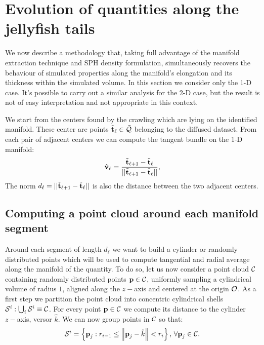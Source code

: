 \section{Evolution of quantities along the jellyfish tails}


We now describe a methodology that, taking full advantage of the manifold extraction technique and SPH density formulation, simultaneously recovers the behaviour of simulated properties along the manifold's elongation and its thickness within the simulated volume.
In this section we consider only the 1-D case.
It's possible to carry out a similar analysis for the 2-D case, but
the result is not of easy interpretation and not appropriate in this context.

We start from the centers found by the crawling which are lying on the identified manifold. These center are points $\tilde{\boldsymbol{\mathbf{t}}}_{\ell} \in \tilde{\mathcal{Q}}$ belonging to the diffused dataset.
From each pair of adjacent centers we can compute the tangent bundle on the 1-D manifold:
\begin{equation}
  \hat{\boldsymbol{\mathbf{v}}}_{\ell} =  \frac{\tilde{\boldsymbol{\mathbf{t}}}_{\ell + 1} - \tilde{\boldsymbol{\mathbf{t}}}_{\ell}}{|| \tilde{\boldsymbol{\mathbf{t}}}_{\ell + 1} - \tilde{\boldsymbol{\mathbf{t}}}_{\ell}||},
\end{equation}
The norm $d_{\ell} = || \tilde{\boldsymbol{\mathbf{t}}}_{\ell + 1} - \tilde{\boldsymbol{\mathbf{t}}}_{\ell}||$ is also the distance between the two adjacent centers.

\subsection{Computing a point cloud around each manifold segment}
Around each segment of length $d_{\ell}$ we want to build a cylinder or randomly distributed points which will be used to compute tangential and radial average along the manifold of the quantity.
To do so, let us now consider a point cloud $\mathcal{C}$ containing randomly distributed points $\boldsymbol{\mathbf{p}} \in \mathcal{C}$, uniformly sampling a cylindrical volume of radius $1$, aligned along the $z-$axis and centered at the origin $\mathcal{O}$.
As a first step we partition the point cloud into concentric cylindrical shells $\mathcal{S}^i: \bigcup_i \mathcal{S}^i \equiv \mathcal{C}$.
For every point $\boldsymbol{\mathbf{p}} \in \mathcal{C}$ we compute its distance to the cylinder $z-$axis, versor $\hat k$.
We can now group points in $\mathcal{C}$ so that:
\begin{equation}
  \mathcal{S}^i =
  \left\{ \boldsymbol{\mathbf{p}}_j:  r_{i-1} \leq \norm{\boldsymbol{\mathbf{p}}_j-\hat{k}} < r_i \right\},\, \forall \boldsymbol{\mathbf{p}}_j \in \mathcal{C}.
\end{equation}

